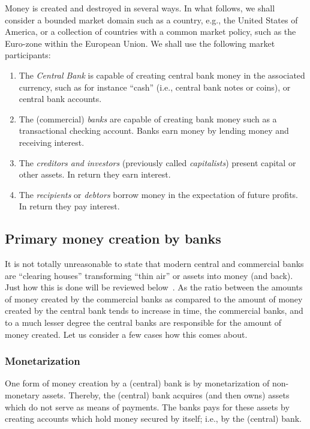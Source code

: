 \documentclass[aps,rmp,preprint,amsfonts,showpacs,showkeys]{revtex4}
\begin{document}
Money is created and destroyed in several ways.
In what follows, we shall consider
a bounded market domain such as a country, e.g., the United States of America,
or a collection of countries with a common market policy, such as the Euro-zone within the European Union.
We shall use the following market participants:
\begin{enumerate}
\item
The {\em Central Bank} is capable of creating central bank money in the associated currency,
such as for instance ``cash'' (i.e., central bank notes  or coins), or central bank accounts.
\item
The (commercial) {\em banks} are capable of creating bank money such as a transactional checking account.
Banks earn money by lending money and receiving interest.
\item
The {\em creditors and investors} (previously \cite{Wicksell-geld,Wicksell-1907} called {\em capitalists})
present capital or other assets.  In return they earn interest.
\item
The  {\em recipients} or {\em debtors} borrow money in the expectation of future profits. In return they pay interest.
\end{enumerate}

\subsection{Primary money creation by banks}

It is not totally unreasonable to state
that modern central and commercial banks are ``clearing houses''
transforming ``thin air'' or assets into money (and back).
Just how this is done will be reviewed below~\cite{schneider-VWLIII}.
As the ratio between the amounts of money created
by the commercial banks as compared to the amount of money
created by the central bank tends to increase in time, the commercial banks, and to a much lesser degree the central banks
are responsible for the amount of money created.
Let us consider a few cases how this comes about.


\subsubsection{Monetarization}

One form of money creation by a (central) bank is by monetarization of non-monetary assets.
Thereby, the (central) bank acquires (and then owns) assets which do not serve as means of payments.
The banks pays for these assets by creating accounts which hold money secured by itself; i.e., by the (central) bank.
\end{document}
